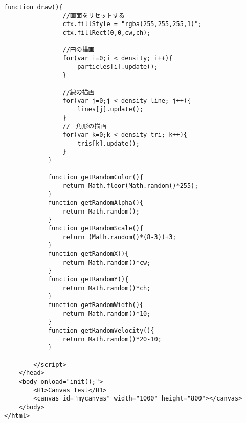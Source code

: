 \documentclass[mingoth,11pt,a4j,uplatex]{jsarticle}
\begin{document}
\begin{lstlisting}[caption=三角形の追加]
			function draw(){
				//画面をリセットする
				ctx.fillStyle = "rgba(255,255,255,1)";
				ctx.fillRect(0,0,cw,ch);
				
				//円の描画
				for(var i=0;i < density; i++){
					particles[i].update();
				}
				
				//線の描画
				for(var j=0;j < density_line; j++){
					lines[j].update();
				}
				//三角形の描画
				for(var k=0;k < density_tri; k++){
					tris[k].update();
				}
			}

			function getRandomColor(){
				return Math.floor(Math.random()*255);
			}
			function getRandomAlpha(){
				return Math.random();
			}
			function getRandomScale(){
				return (Math.random()*(8-3))+3;
			}
			function getRandomX(){
				return Math.random()*cw;
			}
			function getRandomY(){
				return Math.random()*ch;
			}
			function getRandomWidth(){
				return Math.random()*10;
			}
			function getRandomVelocity(){
				return Math.random()*20-10;
			}
			
		</script>
	</head>
	<body onload="init();">
		<H1>Canvas Test</H1>
		<canvas id="mycanvas" width="1000" height="800"></canvas>
	</body>
</html>
\end{lstlisting}



\end{document}
